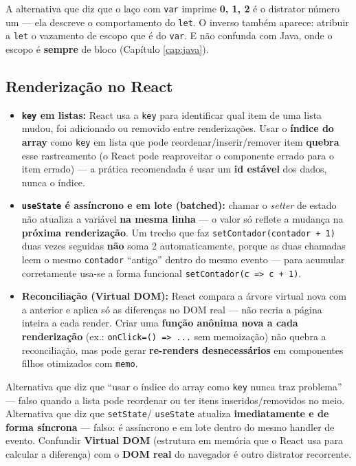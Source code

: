 \begin{pegadinha}
A alternativa que diz que o laço com \texttt{var} imprime \textbf{0, 1, 2} é
o distrator número um --- ela descreve o comportamento do \texttt{let}. O
inverso também aparece: atribuir a \texttt{let} o vazamento de escopo que é
do \texttt{var}. E não confunda com Java, onde o escopo é \textbf{sempre} de
bloco (Capítulo \ref{cap:java}).
\end{pegadinha}

\subsection{Renderização no React}

\begin{itemize}
\item \textbf{\texttt{key} em listas:} React usa a \texttt{key} para
identificar qual item de uma lista mudou, foi adicionado ou removido entre
renderizações. Usar o \textbf{índice do array} como \texttt{key} em lista
que pode reordenar/inserir/remover item \textbf{quebra} esse rastreamento
(o React pode reaproveitar o componente errado para o item errado) --- a
prática recomendada é usar um \textbf{id estável} dos dados, nunca o índice.
\item \textbf{\texttt{useState} é assíncrono e em lote (batched):} chamar o
\textit{setter} de estado não atualiza a variável \textbf{na mesma linha} ---
o valor só reflete a mudança na \textbf{próxima renderização}. Um trecho que
faz \texttt{setContador(contador + 1)} duas vezes seguidas \textbf{não}
soma 2 automaticamente, porque as duas chamadas leem o mesmo \texttt{contador}
``antigo'' dentro do mesmo evento --- para acumular corretamente usa-se a
forma funcional \texttt{setContador(c => c + 1)}.
\item \textbf{Reconciliação (Virtual DOM):} React compara a árvore virtual
nova com a anterior e aplica só as diferenças no DOM real --- não recria a
página inteira a cada render. Criar uma \textbf{função anônima nova a cada
renderização} (ex.: \texttt{onClick={() => ...}} sem memoização) não quebra a
reconciliação, mas pode gerar \textbf{re-renders desnecessários} em
componentes filhos otimizados com \texttt{memo}.
\end{itemize}

\begin{pegadinha}
Alternativa que diz que ``usar o índice do array como \texttt{key} nunca traz
problema'' --- falso quando a lista pode reordenar ou ter itens
inseridos/removidos no meio. Alternativa que diz que \texttt{setState}/
\texttt{useState} atualiza \textbf{imediatamente e de forma síncrona} ---
falso: é assíncrono e em lote dentro do mesmo handler de evento. Confundir
\textbf{Virtual DOM} (estrutura em memória que o React usa para calcular a
diferença) com o \textbf{DOM real} do navegador é outro distrator recorrente.
\end{pegadinha}

